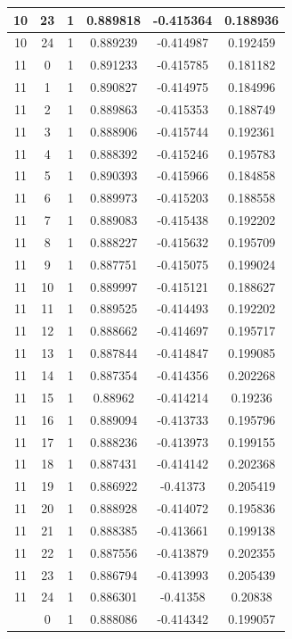 \documentclass[12pt,a4paper]{article}
\numberwithin{equation}{section}
\numberwithin{figure}{section}
\numberwithin{table}{section}
\begin{document}
\begin{longtable}{|c|c|c|c|c|c|}
10 & 23 & 1 & 0.889818 & -0.415364 & 0.188936 \\ \hline
10 & 24 & 1 & 0.889239 & -0.414987 & 0.192459 \\ \hline
11 & 0 & 1 & 0.891233 & -0.415785 & 0.181182 \\ \hline
11 & 1 & 1 & 0.890827 & -0.414975 & 0.184996 \\ \hline
11 & 2 & 1 & 0.889863 & -0.415353 & 0.188749 \\ \hline
11 & 3 & 1 & 0.888906 & -0.415744 & 0.192361 \\ \hline
11 & 4 & 1 & 0.888392 & -0.415246 & 0.195783 \\ \hline
11 & 5 & 1 & 0.890393 & -0.415966 & 0.184858 \\ \hline
11 & 6 & 1 & 0.889973 & -0.415203 & 0.188558 \\ \hline
11 & 7 & 1 & 0.889083 & -0.415438 & 0.192202 \\ \hline
11 & 8 & 1 & 0.888227 & -0.415632 & 0.195709 \\ \hline
11 & 9 & 1 & 0.887751 & -0.415075 & 0.199024 \\ \hline
11 & 10 & 1 & 0.889997 & -0.415121 & 0.188627 \\ \hline
11 & 11 & 1 & 0.889525 & -0.414493 & 0.192202 \\ \hline
11 & 12 & 1 & 0.888662 & -0.414697 & 0.195717 \\ \hline
11 & 13 & 1 & 0.887844 & -0.414847 & 0.199085 \\ \hline
11 & 14 & 1 & 0.887354 & -0.414356 & 0.202268 \\ \hline
11 & 15 & 1 & 0.88962 & -0.414214 & 0.19236 \\ \hline
11 & 16 & 1 & 0.889094 & -0.413733 & 0.195796 \\ \hline
11 & 17 & 1 & 0.888236 & -0.413973 & 0.199155 \\ \hline
11 & 18 & 1 & 0.887431 & -0.414142 & 0.202368 \\ \hline
11 & 19 & 1 & 0.886922 & -0.41373 & 0.205419 \\ \hline
11 & 20 & 1 & 0.888928 & -0.414072 & 0.195836 \\ \hline
11 & 21 & 1 & 0.888385 & -0.413661 & 0.199138 \\ \hline
11 & 22 & 1 & 0.887556 & -0.413879 & 0.202355 \\ \hline
11 & 23 & 1 & 0.886794 & -0.413993 & 0.205439 \\ \hline
11 & 24 & 1 & 0.886301 & -0.41358 & 0.20838 \\ \hline
\pagebreak
12 & 0 & 1 & 0.888086 & -0.414342 & 0.199057 \\ \hline

\end{longtable}
\end{document}
